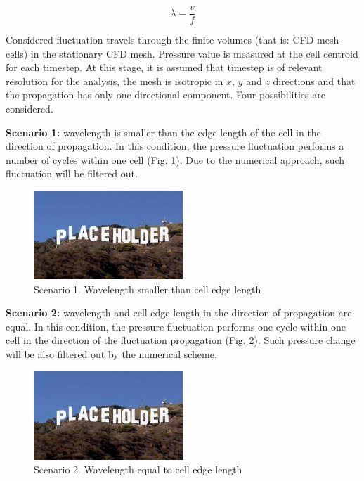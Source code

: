 \begin{equation} \label{eq:wl}
\lambda = \frac{v}{f}
\end{equation}

Considered fluctuation travels through the finite volumes (that is: CFD mesh cells) in the stationary CFD mesh. Pressure value is measured at the cell centroid for each timestep. At this stage, it is assumed that timestep is of relevant resolution for the analysis, the mesh is isotropic in $x$, $y$ and $z$ directions and that the propagation has only one directional component. Four possibilities are considered.

\textbf{Scenario 1:} wavelength is smaller than the edge length of the cell in the direction of propagation. In this condition, the pressure fluctuation performs a number of cycles within one cell (Fig. \ref{scen1}). Due to the numerical approach, such fluctuation will be filtered out.

\begin{figure}[h!]
\centering %
\includegraphics[width=0.5\textwidth]{Pictures/placeholder.jpg}
\caption{Scenario 1. Wavelength smaller than cell edge length}
\label{scen1}
\end{figure}

\textbf{Scenario 2:} wavelength and cell edge length in the direction of propagation are equal. In this condition, the pressure fluctuation performs one cycle within one cell in the direction of the fluctuation propagation (Fig. \ref{scen2}). Such pressure change will be also filtered out by the numerical scheme.

\begin{figure}[h!]
\centering %
\includegraphics[width=0.5\textwidth]{Pictures/placeholder.jpg}
\caption{Scenario 2. Wavelength equal to cell edge length}
\label{scen2}
\end{figure}

